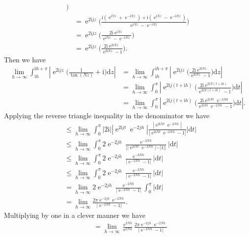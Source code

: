 \documentclass[10pt]{amsart}
\newcommand{\D}{\mathrm{d}}
\newcommand{\I}{\mathrm{i}}
\DeclareMathOperator{\E}{e}
\theoremstyle{nonumberplain}
\begin{document}
\begin{enumerate}[label={\bf {\arabic*}:}]
\begin{align*}
	\bigg) \\
	&= \E^{2 \I jz} \bigg( \frac{\I \left( \E^{\I N z} + \E^{-\I N z} \right) + \I\left( \E^{\I N z} - \E^{-\I N z} \right)}{ \E^{\I N z} - \E^{-\I N z} } \bigg) \\
	&= \E^{2 \I jz} \bigg( \frac{ 2 \I \E^{\I N z} }{ \E^{\I N z} - \E^{-\I N z} } \bigg) \\
	&= \E^{2 \I jz} \bigg( \frac{ 2 \I \E^{2 \I N z} }{ \E^{2 \I N z} - 1 } \bigg).
\end{align*}
Then we have
\begin{align*}
\lim_{h \to \infty} \int_{\I h}^{\I h + \pi} \left| \E^{2 \I jz} \bigg( \frac 1 {\tan (N z)} + \I \bigg) \D z \right|
	&= \lim_{h \to \infty} \int_{\I h}^{\I h + \pi} \left| \E^{2 \I jz}
		\bigg( \frac{ 2 \I \E^{2 \I N z} }{ \E^{2 \I N z} - 1 } \bigg) \D z \right| \\
	&= \lim_{h \to \infty} \int_0^\pi \left| \E^{2 \I j(t + \I h)}
		\bigg( \frac{ 2 \I \E^{2 \I N (t + \I h)} }{ \E^{2 \I N (t + \I h)} - 1 } \bigg) \D t \right| \\
	&= \lim_{h \to \infty} \int_0^\pi \left| \E^{2 \I j(t + \I h)}
		\bigg( \frac{ 2 \I \E^{2 \I N t}\E^{- 2 N h} }{ \E^{2 \I N t}\E^{- 2 N h} - 1 } \bigg) \D t \right|.
\end{align*}
Applying the reverse triangle inequality in the denominator we have
\begin{align*}
	&\leq \lim_{h \to \infty} \int_0^\pi | 2 \I | \left| \E^{2 \I j t}\E^{- 2 j h} \right|
		\frac{ | \E^{2 \I N t}\E^{- 2 N h} |}{| \E^{2 \I N t}\E^{- 2 N h} - 1 |} | \D t | \\
	&\leq \lim_{h \to \infty} \int_0^\pi 2 \E^{- 2 j h}
		\frac{ \E^{- 2 N h} }{| |\E^{2 \I N t}\E^{- 2 N h}| - |1| |} | \D t | \\
	&\leq \lim_{h \to \infty} \int_0^\pi 2 \E^{- 2 j h}
		\frac{ \E^{- 2 N h} }{| \E^{- 2 N h} - 1 |} | \D t | \\
	&\leq \lim_{h \to \infty} \int_0^\pi 2 \E^{- 2 j h}
		\frac{ \E^{- 2 N h} }{| \E^{- 2 N h} - 1 |} | \D t | \\
	&= \lim_{h \to \infty} 2 \E^{- 2 j h}
		\frac{ \E^{- 2 N h} }{| \E^{- 2 N h} - 1 |} \int_0^\pi | \D t | \\
	&= \lim_{h \to \infty}
		\frac{ 2 \pi \E^{- 2 j h} \E^{- 2 N h} }{| \E^{- 2 N h} - 1 |}.
\end{align*}
Multiplying by one in a clever manner we have
\begin{align*}
&= \lim_{h \to \infty} \frac {\E^{ 2 N h}} {\E^{ 2 N h}} \frac{ 2 \pi \E^{- 2 j h} \E^{- 2 N h} }{| \E^{- 2 N h} - 1 |} \\

\end{align*}
\end{enumerate}
\end{document}
